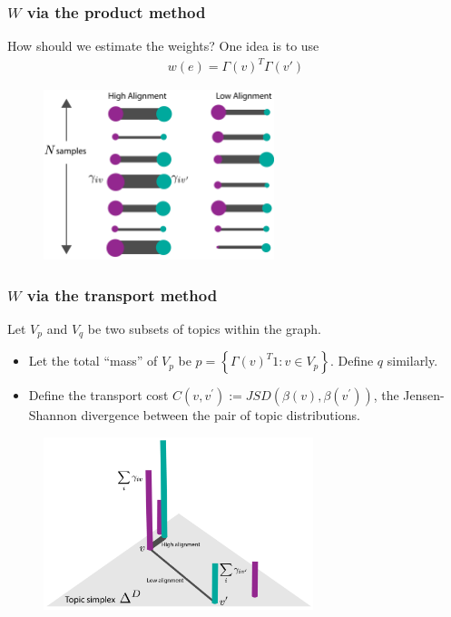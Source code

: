 \documentclass[hyperref={colorlinks=true, linkcolor=violet, citecolor=SeaGreen}]{beamer}
\begin{document}
\begin{frame}
  \frametitle{$W$ via the product method}
How should we estimate the weights? One idea is to use
\begin{align*}
w\left(e\right) = \Gamma\left(v\right)^T\Gamma\left(v'\right)
\end{align*}
\begin{figure}
\includegraphics[width=0.6\textwidth]{product_alignment}
\end{figure}
\end{frame}

\begin{frame}
  \frametitle{$W$ via the transport method}
  Let $V_p$ and $V_q$ be two subsets of topics within the graph.
  \begin{itemize}
    \item Let the total ``mass'' of $V_p$ be $p =
    \left\{\Gamma\left(v\right)^T 1 : v \in V_{p}\right\}$. Define $q$ similarly.
    \item Define the transport cost $C\left(v, v^\prime\right) :=
    JSD\left(\beta\left(v\right), \beta\left(v^\prime\right)\right)$, the
    Jensen-Shannon divergence between the pair of topic distributions.
  \end{itemize}
\begin{figure}
\includegraphics[width=0.7\textwidth]{transport_alignment}
\end{figure}
\end{frame}
\end{document}
